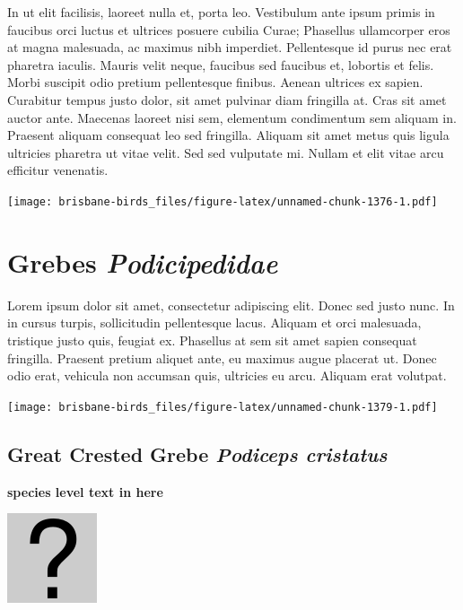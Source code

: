 \documentclass[]{book}
\let\origfigure\figure
\let\endorigfigure\endfigure
\renewenvironment{figure}[1][2] {
  \expandafter\origfigure\expandafter[H]
} {
  \endorigfigure
}
\begin{document}
In ut elit facilisis, laoreet nulla et, porta leo. Vestibulum ante ipsum
primis in faucibus orci luctus et ultrices posuere cubilia Curae;
Phasellus ullamcorper eros at magna malesuada, ac maximus nibh
imperdiet. Pellentesque id purus nec erat pharetra iaculis. Mauris velit
neque, faucibus sed faucibus et, lobortis et felis. Morbi suscipit odio
pretium pellentesque finibus. Aenean ultrices ex sapien. Curabitur
tempus justo dolor, sit amet pulvinar diam fringilla at. Cras sit amet
auctor ante. Maecenas laoreet nisi sem, elementum condimentum sem
aliquam in. Praesent aliquam consequat leo sed fringilla. Aliquam sit
amet metus quis ligula ultricies pharetra ut vitae velit. Sed sed
vulputate mi. Nullam et elit vitae arcu efficitur venenatis.

\begin{figure}
\centering
\texttt{[image: brisbane-birds\_files/figure-latex/unnamed-chunk-1376-1.pdf]}
\caption{\label{fig:unnamed-chunk-1376}insert figure caption}
\end{figure}

\chapter{\texorpdfstring{Grebes
\emph{Podicipedidae}}{Grebes Podicipedidae}}\label{grebes-podicipedidae}

Lorem ipsum dolor sit amet, consectetur adipiscing elit. Donec sed justo
nunc. In in cursus turpis, sollicitudin pellentesque lacus. Aliquam et
orci malesuada, tristique justo quis, feugiat ex. Phasellus at sem sit
amet sapien consequat fringilla. Praesent pretium aliquet ante, eu
maximus augue placerat ut. Donec odio erat, vehicula non accumsan quis,
ultricies eu arcu. Aliquam erat volutpat.

\texttt{[image: brisbane-birds\_files/figure-latex/unnamed-chunk-1379-1.pdf]}

\section{\texorpdfstring{Great Crested Grebe \emph{Podiceps
cristatus}}{Great Crested Grebe Podiceps cristatus}}\label{great-crested-grebe-podiceps-cristatus}

\textbf{species level text in here}

\begin{figure}
\centering
\includegraphics{assets/missing.png}
\caption{No image for species}
\end{figure}
\end{document}
